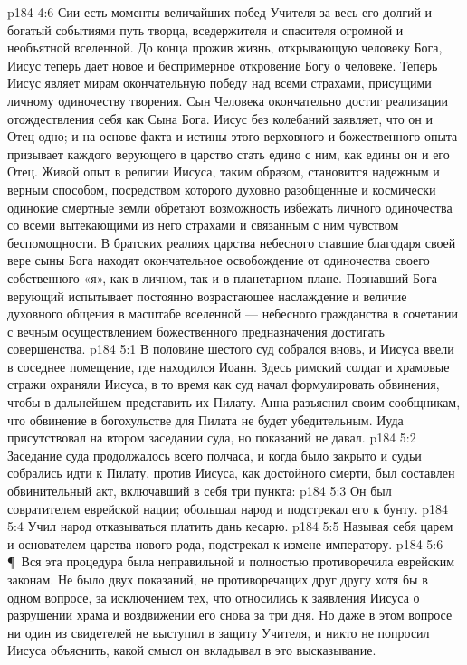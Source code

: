 \vs p184 4:6 Сии есть моменты величайших побед Учителя за весь его долгий и богатый событиями путь творца, вседержителя и спасителя огромной и необъятной вселенной. До конца прожив жизнь, открывающую человеку Бога, Иисус теперь дает новое и беспримерное откровение Богу о человеке. Теперь Иисус являет мирам окончательную победу над всеми страхами, присущими личному одиночеству творения. Сын Человека окончательно достиг реализации отождествления себя как Сына Бога. Иисус без колебаний заявляет, что он и Отец одно; и на основе факта и истины этого верховного и божественного опыта призывает каждого верующего в царство стать едино с ним, как едины он и его Отец. Живой опыт в религии Иисуса, таким образом, становится надежным и верным способом, посредством которого духовно разобщенные и космически одинокие смертные земли обретают возможность избежать личного одиночества со всеми вытекающими из него страхами и связанным с ним чувством беспомощности. В братских реалиях царства небесного ставшие благодаря своей вере сыны Бога находят окончательное освобождение от одиночества своего собственного «я», как в личном, так и в планетарном плане. Познавший Бога верующий испытывает постоянно возрастающее наслаждение и величие духовного общения в масштабе вселенной --- небесного гражданства в сочетании с вечным осуществлением божественного предназначения достигать совершенства.
\vs p184 5:1 В половине шестого суд собрался вновь, и Иисуса ввели в соседнее помещение, где находился Иоанн. Здесь римский солдат и храмовые стражи охраняли Иисуса, в то время как суд начал формулировать обвинения, чтобы в дальнейшем представить их Пилату. Анна разъяснил своим сообщникам, что обвинение в богохульстве для Пилата не будет убедительным. Иуда присутствовал на втором заседании суда, но показаний не давал.
\vs p184 5:2 Заседание суда продолжалось всего полчаса, и когда было закрыто и судьи собрались идти к Пилату, против Иисуса, как достойного смерти, был составлен обвинительный акт, включавший в себя три пункта:
\vs p184 5:3 \bibnobreakspace Он был совратителем еврейской нации; обольщал народ и подстрекал его к бунту.
\vs p184 5:4 \bibnobreakspace Учил народ отказываться платить дань кесарю.
\vs p184 5:5 \bibnobreakspace Называя себя царем и основателем царства нового рода, подстрекал к измене императору.
\vs p184 5:6 \P\ Вся эта процедура была неправильной и полностью противоречила еврейским законам. Не было двух показаний, не противоречащих друг другу хотя бы в одном вопросе, за исключением тех, что относились к заявления Иисуса о разрушении храма и воздвижении его снова за три дня. Но даже в этом вопросе ни один из свидетелей не выступил в защиту Учителя, и никто не попросил Иисуса объяснить, какой смысл он вкладывал в это высказывание.
